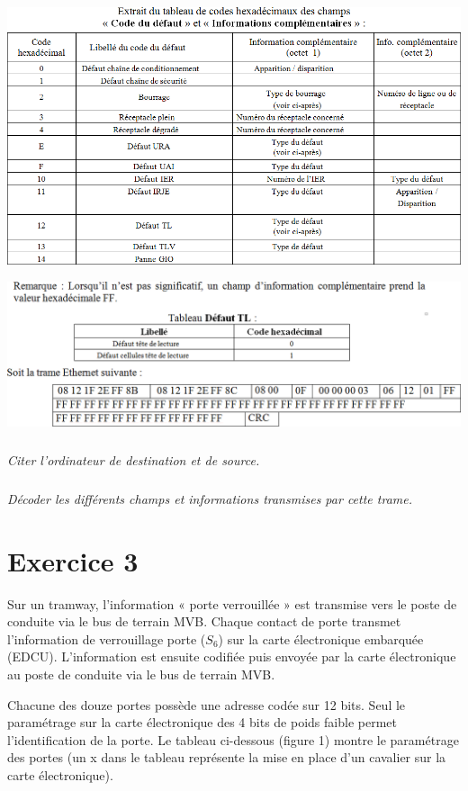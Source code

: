\documentclass[10pt]{article}
\begin{document}
\begin{center}
\includegraphics[width=.8\textwidth]{images/im_07}
\end{center}

\begin{center}
\includegraphics[width=.8\textwidth]{images/im_08}
\end{center}

\subparagraph{}
\textit{Citer l’ordinateur de destination et de source.}

\subparagraph{}
\textit{Décoder les différents champs et informations transmises par cette trame.}

\section{Exercice 3}
\setcounter{subparagraph}{0}
Sur un tramway, l’information « porte verrouillée » est transmise vers le poste de conduite via le bus de terrain MVB. Chaque contact de porte transmet l’information de verrouillage porte ($S_6$) sur la carte électronique embarquée  (EDCU). L’information est ensuite codifiée puis envoyée par la carte électronique au poste de conduite via le bus de terrain MVB. 

Chacune des douze portes possède une adresse codée sur 12 bits. Seul le paramétrage sur la carte électronique des 4 bits de poids faible permet l'identification de la porte. Le tableau ci-dessous (figure 1) montre le paramétrage des portes (un x dans le tableau représente la mise en place d’un cavalier sur la carte électronique). 
\end{document}
